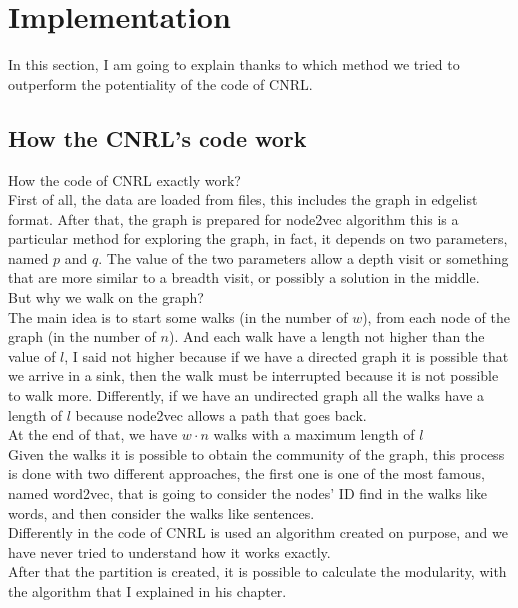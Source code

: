 %
%
%
\chapter{Implementation}
In this section, I am going to explain thanks to which method we tried to outperform the potentiality of the code of CNRL. 
\section{How the CNRL's code work}
How the code of CNRL exactly work?\\
First of all, the data are loaded from files, this includes the graph in edgelist format. After that, the graph is prepared for node2vec algorithm this is a particular method for exploring the graph, in fact, it depends on two parameters, named $p$ and $q$. The value of the two parameters allow a depth visit or something that are more similar to a breadth visit, or possibly a solution in the middle.\\
But why we walk on the graph?\\
The main idea is to start some walks (in the number of $w$), from each node of the graph (in the number of $n$). And each walk have a length not higher than the value of $l$, I said not higher because if we have a directed graph it is possible that we arrive in a sink, then the walk must be interrupted because it is not possible to walk more. Differently, if we have an undirected graph all the walks have a length of $l$ because node2vec allows a path that goes back.\\
At the end of that, we have $w \cdot n$ walks with a maximum length of $l$\\
Given the walks it is possible to obtain the community of the graph, this process is done with two different approaches, the first one is one of the most famous, named word2vec, that is going to consider the nodes' ID find in the walks like words, and then consider the walks like sentences.\\
Differently in the code of CNRL is used an algorithm created on purpose, and we have never tried to understand how it works exactly.\\
After that the partition is created, it is possible to calculate the modularity, with the algorithm that I explained in his chapter.
%
